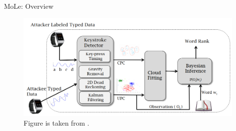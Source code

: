 \documentclass[ucs,9pt,usenames,dvipsnames]{beamer}
\begin{document}
\begin{frame}{MoLe: Overview}
	\begin{figure}
	\centering
	\includegraphics[width=1\linewidth]{imgs/moleOverview}
	\caption{Figure is taken from \cite{b1}.}
	\end{figure}
	
	
	

\end{frame}
\end{document}

